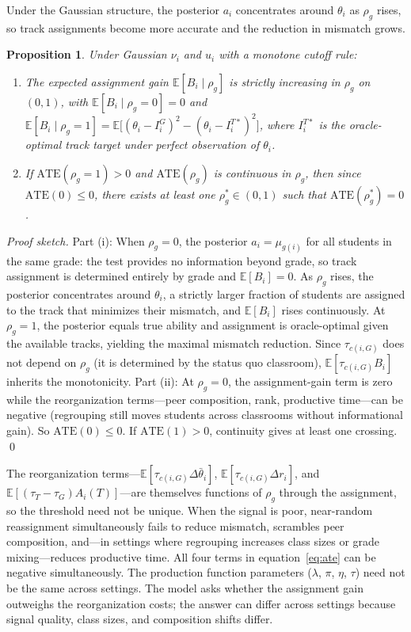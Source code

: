 \documentclass[11pt]{article}
\newtheorem{proposition}{Proposition}
\newcommand{\E}{\mathbb{E}}
\begin{document}
Under the Gaussian structure, the posterior $a_i$ concentrates around $\theta_i$ as $\rho_g$ rises, so track assignments become more accurate and the reduction in mismatch grows.

\begin{proposition}
\label{prop:threshold}
Under Gaussian $\nu_i$ and $u_i$ with a monotone cutoff rule:
\begin{enumerate}
\item[(i)] The expected assignment gain $\E[B_i \mid \rho_g]$ is strictly increasing in $\rho_g$ on $(0,1)$, with $\E[B_i \mid \rho_g = 0] = 0$ and $\E[B_i \mid \rho_g = 1] = \E\!\big[(\theta_i - I_i^G)^2 - (\theta_i - I_i^{T*})^2\big]$, where $I_i^{T*}$ is the oracle-optimal track target under perfect observation of $\theta_i$.
\item[(ii)] If $\text{ATE}(\rho_g = 1) > 0$ and $\text{ATE}(\rho_g)$ is continuous in $\rho_g$, then since $\text{ATE}(0) \leq 0$, there exists at least one $\rho^*_g \in (0,1)$ such that $\text{ATE}(\rho^*_g) = 0$.
\end{enumerate}
\end{proposition}

\noindent \emph{Proof sketch.} Part (i): When $\rho_g = 0$, the posterior $a_i = \mu_{g(i)}$ for all students in the same grade: the test provides no information beyond grade, so track assignment is determined entirely by grade and $\E[B_i] = 0$. As $\rho_g$ rises, the posterior concentrates around $\theta_i$, a strictly larger fraction of students are assigned to the track that minimizes their mismatch, and $\E[B_i]$ rises continuously. At $\rho_g = 1$, the posterior equals true ability and assignment is oracle-optimal given the available tracks, yielding the maximal mismatch reduction. Since $\tau_{c(i,G)}$ does not depend on $\rho_g$ (it is determined by the status quo classroom), $\E[\tau_{c(i,G)} B_i]$ inherits the monotonicity. Part (ii): At $\rho_g = 0$, the assignment-gain term is zero while the reorganization terms---peer composition, rank, productive time---can be negative (regrouping still moves students across classrooms without informational gain). So $\text{ATE}(0) \leq 0$. If $\text{ATE}(1) > 0$, continuity gives at least one crossing. \qed

The reorganization terms---$\E[\tau_{c(i,G)}\Delta\bar{\theta}_i]$, $\E[\tau_{c(i,G)}\Delta r_i]$, and $\E[(\tau_T - \tau_G)A_i(T)]$---are themselves functions of $\rho_g$ through the assignment, so the threshold need not be unique. When the signal is poor, near-random reassignment simultaneously fails to reduce mismatch, scrambles peer composition, and---in settings where regrouping increases class sizes or grade mixing---reduces productive time. All four terms in equation~\eqref{eq:ate} can be negative simultaneously. The production function parameters ($\lambda$, $\pi$, $\eta$, $\tau$) need not be the same across settings. The model asks whether the assignment gain outweighs the reorganization costs; the answer can differ across settings because signal quality, class sizes, and composition shifts differ.
\end{document}
